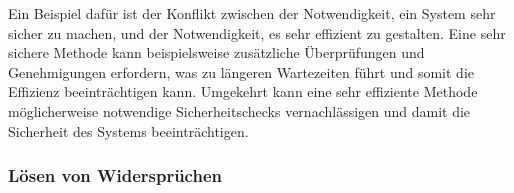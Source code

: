 Ein Beispiel dafür ist der Konflikt zwischen der Notwendigkeit, ein System sehr sicher zu machen,
und der Notwendigkeit, es sehr effizient zu gestalten.
Eine sehr sichere Methode kann beispielsweise zusätzliche Überprüfungen und Genehmigungen erfordern,
was zu längeren Wartezeiten führt und somit die Effizienz beeinträchtigen kann.
Umgekehrt kann eine sehr effiziente Methode möglicherweise notwendige Sicherheitschecks vernachlässigen
und damit die Sicherheit des Systems beeinträchtigen.

\subsubsection{Lösen von Widersprüchen}\label{subsubsec:loesen}

